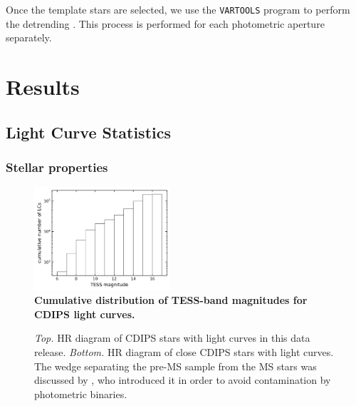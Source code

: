 \documentclass[12pt,twocolumn,tighten]{aastex62}
\begin{document}
Once the template stars are selected, we use the \texttt{VARTOOLS}
program to perform the detrending \citep{Hartman_Bakos_2016}.
This process is performed for each photometric aperture
separately.


\section{Results}
\label{sec:results}



\subsection{Light Curve Statistics}
\label{subsec:lcstatistics}

\subsubsection{Stellar properties}

\begin{figure}[t]
	\begin{center}
		\leavevmode
		\includegraphics[width=0.45\textwidth]{cdf_T_mag.png}
	\end{center}
	\vspace{-0.5cm}
	\caption{
    {\bf Cumulative distribution of TESS-band magnitudes for CDIPS
    light curves.}
		\label{fig:cdf_T_mag}
	}
\end{figure}

\begin{figure}[!ht]
	\vspace{-0.8cm}
	\caption{
    {\it Top.} HR diagram of CDIPS stars with light curves in this
    data release.  {\it Bottom.} HR diagram of close CDIPS stars with
    light curves. The wedge separating the pre-MS sample from the MS
    stars was discussed by \citet{zari_3d_2018}, who introduced it in
    order to avoid contamination by photometric binaries.
	}
	\label{fig:hrd}
\end{figure}
\end{document}
